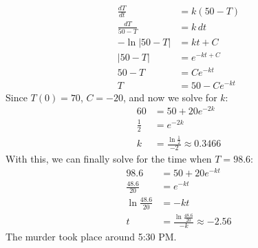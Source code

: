 \documentclass[12pt]{article}
\begin{document}
\begin{enumerate}
\begin{align*}
              \frac{dT}{dt}   & =k(50-T)     \\
              \frac{dT}{50-T} & =k\,dt       \\
              -\ln |50-T|     & =kt+C        \\
              |50-T|          & =e^{-kt+C}   \\
              50-T            & =Ce^{-kt}    \\
              T               & =50-Ce^{-kt}
          \end{align*}
          Since $T(0)=70$, $C=-20$, and now we solve for $k$:
          \begin{align*}
              60          & =50+20e^{-2k}                             \\
              \frac{1}{2} & =e^{-2k}                                  \\
              k           & =\frac{\ln \frac{1}{2}}{-2}\approx 0.3466
          \end{align*}
          With this, we can finally solve for the time when $T=98.6$:
          \begin{align*}
              98.6                & = 50+20e^{-kt}                                        \\
              \frac{48.6}{20}     & = e^{-kt}                                             \\
              \ln \frac{48.6}{20} & = -kt                                                 \\
              t                   & =\frac{\ln \frac{48.6}{20}}{-k} \approx \boxed{-2.56}
          \end{align*}
          The murder took place around 5:30 PM\@.
\end{enumerate}
\end{document}
